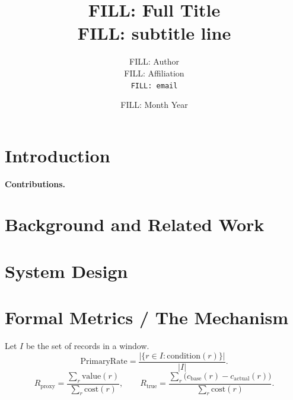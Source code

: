\documentclass[11pt]{article}
\title{\vspace{-2em}\textbf{FILL: Full Title\\ \large FILL: subtitle line}}
\author{FILL: Author\\ \small FILL: Affiliation\\ \small \texttt{FILL: email}}
\date{FILL: Month Year}
\begin{document}
\maketitle
\thispagestyle{fancy}

\begin{abstract}
\noindent
\end{abstract}
\vspace{0.5em}

\section{Introduction}
\textbf{Contributions.} %

\section{Background and Related Work}

\section{System Design}

\section{Formal Metrics / The Mechanism}
Let $I$ be the set of records in a window. %
\[
\text{PrimaryRate} = \frac{|\{r \in I : \text{condition}(r)\}|}{|I|}.
\]
\[
R_{\text{proxy}} = \frac{\sum_{r}\text{value}(r)}{\sum_{r}\text{cost}(r)}, \qquad
R_{\text{true}} = \frac{\sum_{r}\big(c_{\text{base}}(r) - c_{\text{actual}}(r)\big)}{\sum_{r}\text{cost}(r)}.
\]
\end{document}
